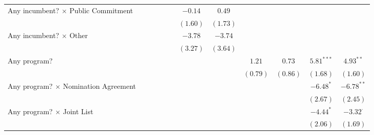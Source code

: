 \begin{sidewaystable}
\begin{center}
{\begin{tabular}{l c c c c c c c c c c c }
Any incumbent? $\times$ Public Commitment          &              &                 &                 &                 &              & $-0.14$      & $0.49$       &                 &              &                 &                 \\
                                                   &              &                 &                 &                 &              & $(1.60)$     & $(1.73)$     &                 &              &                 &                 \\
Any incumbent? $\times$ Other                      &              &                 &                 &                 &              & $-3.78$      & $-3.74$      &                 &              &                 &                 \\
                                                   &              &                 &                 &                 &              & $(3.27)$     & $(3.64)$     &                 &              &                 &                 \\
Any program?                                       &              &                 &                 &                 &              &              &              & $1.21$          & $0.73$       & $5.81^{***}$    & $4.93^{**}$     \\
                                                   &              &                 &                 &                 &              &              &              & $(0.79)$        & $(0.86)$     & $(1.68)$        & $(1.60)$        \\
Any program? $\times$ Nomination Agreement         &              &                 &                 &                 &              &              &              &                 &              & $-6.48^{*}$     & $-6.78^{**}$    \\
                                                   &              &                 &                 &                 &              &              &              &                 &              & $(2.67)$        & $(2.45)$        \\
Any program? $\times$ Joint List                   &              &                 &                 &                 &              &              &              &                 &              & $-4.44^{*}$     & $-3.32^{\cdot}$ \\
                                                   &              &                 &                 &                 &              &              &              &                 &              & $(2.06)$        & $(1.69)$        \\

\end{tabular}}
\end{center}
\end{sidewaystable}
